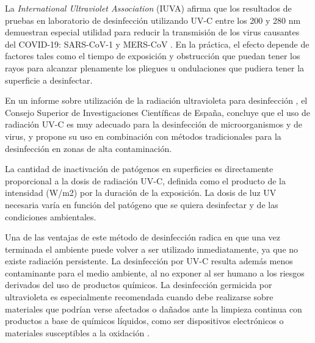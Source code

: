 La \emph{International Ultraviolet Association}  (IUVA) afirma que los resultados de pruebas en laboratorio de desinfección utilizando UV-C entre los 200 y 280 nm demuestran especial utilidad para reducir la transmisión de los virus causantes del COVID-19:  SARS-CoV-1 y MERS-CoV \citep{IUA}. En la práctica, el efecto depende de factores tales como  el tiempo de exposición y obstrucción que puedan tener los rayos para alcanzar plenamente los pliegues u ondulaciones que pudiera tener la superficie a desinfectar. 

En un informe sobre utilización de la radiación ultravioleta para desinfección \citep{CSIC}, el Consejo Superior de Investigaciones Científicas de España, concluye que el uso de radiación UV-C es muy adecuado para la desinfección de microorganismos y de virus, y propone su uso en combinación con métodos tradicionales para la desinfección en  zonas de alta contaminación.

La cantidad de inactivación de patógenos en superficies es directamente proporcional a la dosis de radiación UV-C, definida como el producto de la intensidad (W/m2) por la duración de la exposición. La dosis de luz UV necesaria varía en función del patógeno que se quiera desinfectar y de las condiciones ambientales\citep{CIE}.

Una de las ventajas de este método de desinfección radica en que una vez terminada el ambiente puede volver a ser utilizado inmediatamente, ya que no existe radiación persistente. La desinfección  por UV-C resulta además menos contaminante para el medio ambiente, al no exponer al ser humano a los riesgos derivados del uso de productos químicos. La desinfección germicida por ultravioleta es especialmente recomendada cuando debe realizarse sobre materiales que podrían verse afectados o dañados ante la limpieza continua con productos a base de químicos líquidos, como ser dispositivos electrónicos o materiales susceptibles a la  oxidación \citep{interior}. 
%

